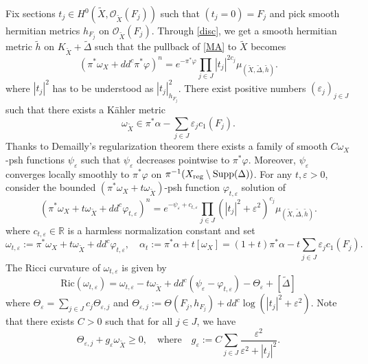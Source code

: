 \documentclass[12pt]{amsart}
\theoremstyle{definition}
\newcommand{\tX}{\widetilde{X}}
\newcommand{\Supp}{\mathrm{Supp}}
\numberwithin{equation}{section}
\newcommand{\R}{\mathbb R}
\newcommand{\tDe}{\widetilde \Delta}
\newcommand{\ep}{\varepsilon}
\begin{document}
Fix sections $t_j\in H^0(\tX, \mathcal O_{\tX}(F_j))$ such that $(t_j=0)=F_j$ and pick smooth hermitian metrics $h_{F_j}$ on $\mathcal O_{\tX}(F_j)$. Through \eqref{disc}, we get a smooth hermitian metric $\tilde h$ on $K_{\tX}+\tDe$ such that the pullback of \eqref{MA} to $\tX$ becomes
\begin{equation}
\label{MA2}
(\pi^*\omega_X+dd^c \pi^*\varphi)^n=e^{-\pi^*\varphi}\prod_{j\in J} |t_j|^{2c_j} \mu_{(\tX,\tDe,\tilde h)}.
\end{equation}
where $|t_j|^{2}$ has to be understood as $|t_j|^{2}_{h_{F_j}}$. There exist positive numbers $(\ep_j)_{j\in J}$ such that there exists a K\"ahler metric
 \[\omega_{\tX}\in \pi^*\alpha-\sum_{j\in J} \ep_j c_1(F_j).\] 
 Thanks to Demailly's regularization theorem there exists a family of smooth $C\omega_X$-psh functions $\psi_{\ep}$ such that $\psi_{\ep}$ decreases pointwise to $\pi^*\varphi$. Moreover, $\psi_\ep$ converges locally smoothly to $\pi^*\varphi$ on $\pi^{-1}(X_{\rm reg}\setminus \Supp(\Delta))$. For any $t,\ep>0$, consider the bounded $(\pi^*\omega_X+t\omega_{\tX})$-psh function $\varphi_{t,\ep}$ solution of
\begin{equation}
\label{MA3}
(\pi^*\omega_X+t\omega_{\tX}+dd^c \varphi_{t,\ep})^n=e^{-\psi_\ep+c_{t,\ep}}\prod_{j\in J} (|t_j|^{2}+\ep^2)^{c_j} \mu_{(\tX,\tDe,\tilde h)}.
\end{equation}
where $c_{t,\ep}\in \R$ is a harmless normalization constant and set 
\[\omega_{t,\ep}:=\pi^*\omega_X+t\omega_{\tX}+dd^c \varphi_{t,\ep}, \quad \alpha_t:=\pi^*\alpha+t[\omega_X]=(1+t)\pi^*\alpha-t\sum_{j\in J} \ep_j c_1(F_j).\] 
The Ricci curvature of $\omega_{t,\ep}$ is given by 
\begin{equation}
\label{Ricci}
\mathrm{Ric}(\omega_{t,\ep})=\omega_{t,\ep}-t \omega_{\tX}+ dd^c(\psi_\ep-\varphi_{t,\ep})-\Theta_\ep+[\tDe]
\end{equation}
where $\Theta_\ep=\sum_{j\in J} c_j  \Theta_{\ep, j}$ and $\Theta_{\ep, j}:=\Theta(F_j, h_{F_j})+dd^c \log (|t_j|^2+\ep^2)$. Note that there exists $C>0$ such that for all $j\in J$, we have
\begin{equation}
\label{min theta}
\Theta_{\ep,j}+g_\ep \omega_{\tX}\ge 0, \quad \mbox{where} \quad g_\ep:=C\sum_{j\in J} \frac{\ep^2}{\ep^2+|t_j|^2}.
\end{equation}
\end{document}
